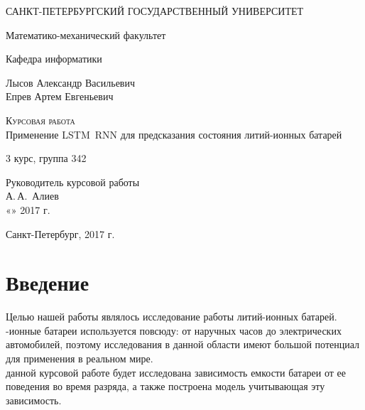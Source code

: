 \documentclass[russian,english,18pt,a4paper,reqno,dviphfm]{article}
\begin{document}

\begin{titlepage}
  \begin{center}

    САНКТ-ПЕТЕРБУРГСКИЙ ГОСУДАРСТВЕННЫЙ УНИВЕРСИТЕТ
    \vspace{3.25cm}

    Математико-механический факультет

    Кафедра информатики
    \vspace{3.25cm}


    Лысов Александр Васильевич \\
    Епрев Артем Евгеньевич
    \vfill

    \textsc{Курсовая работа}\\[5mm]

    {\LARGE{Применение LSTM~RNN для предсказания состояния литий-ионных батарей}}
    \bigskip

    3 курс, группа 342
  \end{center}
  \vfill

  \newlength{\ML}
  \vfill
  \hfill\begin{minipage}{0.4\textwidth}
    Руководитель курсовой работы\\
    \underline{\hspace{\ML}} А.\,А.~Алиев\\
    «\underline{\hspace{0.7cm}}» \underline{\hspace{2cm}} 2017 г.
  \end{minipage}%

  \vfill

  \begin{center}
    Санкт-Петербург, 2017 г.
  \end{center}
\end{titlepage}

\newpage

\tableofcontents

\newpage

\section{Введение}
Целью нашей работы являлось исследование работы литий-ионных батарей. \\
-ионные батареи используется повсюду: от наручных часов до электрических автомобилей, поэтому исследования в данной области имеют большой потенциал для применения в реальном мире. \\
 данной курсовой работе будет исследована зависимость емкости батареи от ее поведения во время разряда, а также построена модель учитывающая эту зависимость.
\newpage
\end{document}
